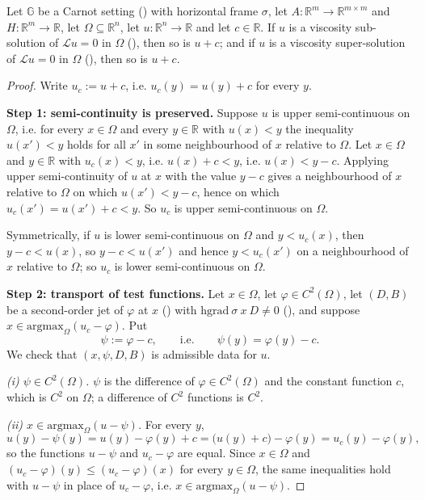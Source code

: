 \begin{lemma}
Let $\mathbb G$ be a Carnot setting () with horizontal frame
$\sigma$, let $A:\mathbb R^{m}\to\mathbb R^{m\times m}$ and
$H:\mathbb R^{m}\to\mathbb R$, let $\Omega\subseteq\mathbb R^{n}$, let
$u:\mathbb R^{n}\to\mathbb R$ and let $c\in\mathbb R$. If $u$ is a viscosity sub-solution of
$\mathcal Lu=0$ in $\Omega$ (), then so is $u+c$; and if $u$ is a
viscosity super-solution of $\mathcal Lu=0$ in $\Omega$ (), then so
is $u+c$.
\end{lemma}
\begin{proof}
Write $u_c:=u+c$, i.e. $u_c(y)=u(y)+c$ for every $y$.

\medskip\noindent\textbf{Step 1: semi-continuity is preserved.} Suppose $u$ is upper
semi-continuous on $\Omega$, i.e. for every $x\in\Omega$ and every $y\in\mathbb R$ with
$u(x)<y$ the inequality $u(x')<y$ holds for all $x'$ in some neighbourhood of $x$ relative
to $\Omega$. Let $x\in\Omega$ and $y\in\mathbb R$ with $u_c(x)<y$, i.e. $u(x)+c<y$, i.e.
$u(x)<y-c$. Applying upper semi-continuity of $u$ at $x$ with the value $y-c$ gives a
neighbourhood of $x$ relative to $\Omega$ on which $u(x')<y-c$, hence on which
$u_c(x')=u(x')+c<y$. So $u_c$ is upper semi-continuous on $\Omega$.

Symmetrically, if $u$ is lower semi-continuous on $\Omega$ and $y<u_c(x)$, then
$y-c<u(x)$, so $y-c<u(x')$ and hence $y<u_c(x')$ on a neighbourhood of $x$ relative to
$\Omega$; so $u_c$ is lower semi-continuous on $\Omega$.

\medskip\noindent\textbf{Step 2: transport of test functions.} Let $x\in\Omega$, let
$\varphi\in C^{2}(\Omega)$, let $(D,B)$ be a second-order jet of $\varphi$ at $x$
() with $\mathrm{hgrad}\ \sigma\ x\ D\ne0$ (), and
suppose $x\in\mathrm{argmax}_\Omega(u_c-\varphi)$. Put
\[
 \psi:=\varphi-c,\qquad\text{i.e.}\qquad \psi(y)=\varphi(y)-c .
\]
We check that $(x,\psi,D,B)$ is admissible data for $u$.

\emph{(i) $\psi\in C^{2}(\Omega)$.} $\psi$ is the difference of $\varphi\in C^{2}(\Omega)$
and the constant function $c$, which is $C^{2}$ on $\Omega$; a difference of $C^{2}$
functions is $C^{2}$.

\emph{(ii) $x\in\mathrm{argmax}_\Omega(u-\psi)$.} For every $y$,
\[
 u(y)-\psi(y)=u(y)-\varphi(y)+c=\big(u(y)+c\big)-\varphi(y)=u_c(y)-\varphi(y),
\]
so the functions $u-\psi$ and $u_c-\varphi$ are equal. Since $x\in\Omega$ and
$(u_c-\varphi)(y)\le(u_c-\varphi)(x)$ for every $y\in\Omega$, the same inequalities hold
with $u-\psi$ in place of $u_c-\varphi$, i.e. $x\in\mathrm{argmax}_\Omega(u-\psi)$.


\end{proof}
